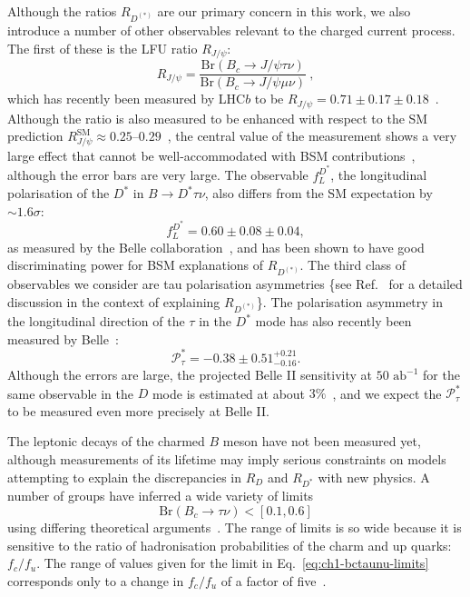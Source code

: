 Although the ratios $R_{D^{(*)}}$ are our primary concern in this work, we also
introduce a number of other observables relevant to the charged current process.
The first of these is the LFU ratio $R_{J/\psi}$:
\begin{equation}
  \label{eq:ch1-rjpsi}
  R_{J/\psi} = \frac{\mathrm{Br}(B_{c} \to J/\psi \tau \nu)}{\mathrm{Br}(B_{c} \to J/\psi \mu \nu)} \ ,
\end{equation}
which has recently been measured by LHC$b$ to be
$R_{J/\psi} = 0.71 \pm 0.17 \pm 0.18$~\cite{Aaij:2017tyk}. Although the ratio is
also measured to be enhanced with respect to the SM prediction
$R_{J/\psi}^{\text{SM}} \approx 0.25$--$0.29$~\cite{Anisimov:1998uk,
  Kiselev:2002vz, Ivanov:2006ni, Hernandez:2006gt, Huang:2007kb, Wang:2008xt,
  Issadykov:2018myx, Wen-Fei:2013uea, Alok:2017qsi, Azatov:2018knx, Hu:2019qcn,
  Leljak:2019eyw, Azizi:2019aaf}, the central value of the measurement shows a
very large effect that cannot be well-accommodated with BSM
contributions~\cite{Murgui:2019czp}, although the error bars are very large. The
observable $f_L^{D^*}$, the longitudinal polarisation of the $D^*$ in
$B \to D^* \tau \nu$, also differs from the SM expectation by $\sim 1.6 \sigma$:
\begin{equation}
    f_L^{D^*} = 0.60 \pm 0.08 \pm 0.04,
\end{equation}
as measured by the Belle collaboration~\cite{Abdesselam:2019wbt}, and has been
shown to have good discriminating power for BSM explanations of $R_{D^{(*)}}$.
The third class of observables we consider are tau polarisation asymmetries
\{see Ref.~\cite{Asadi:2018sym} for a detailed discussion in the context of
explaining $R_{D^{(*)}}$\}. The polarisation asymmetry in the longitudinal
direction of the $\tau$ in the $D^*$ mode has also recently been measured by
Belle~\cite{Hirose:2016wfn}:
\begin{equation}
\mathcal{P}_{\tau}^{*} = -0.38 \pm 0.51^{+0.21}_{-0.16} .
\end{equation}
Although the errors are large, the projected Belle II sensitivity at
$50 \text{ ab}^{-1}$ for the same observable in the $D$ mode is estimated at
about $3\%$~\cite{Alonso:2017ktd}, and we expect the $\mathcal{P}_\tau^{*}$ to
be measured even more precisely at Belle II.

The leptonic decays of the charmed $B$ meson have not been measured yet,
although measurements of its lifetime may imply serious constraints on models
attempting to explain the discrepancies in $R_{D}$ and $R_{D^{*}}$ with new
physics. A number of groups have inferred a wide variety of limits
\begin{equation}
  \label{eq:ch1-bctaunu-limits}
 \mathrm{Br}(B_{c} \to \tau \nu) < [0.1, 0.6]
\end{equation}
using differing theoretical arguments~\cite{Li:2016vvp, Akeroyd:2017mhr,
  Alonso:2016oyd, Blanke:2018yud, Bardhan:2019ljo}. The range of limits is so
wide because it is sensitive to the ratio of hadronisation probabilities of the
charm and up quarks: $f_{c}/f_{u}$. The range of values given for the limit in
Eq.~\eqref{eq:ch1-bctaunu-limits} corresponds only to a change in $f_{c}/f_{u}$ of a
factor of five~\cite{Bardhan:2019ljo}.

